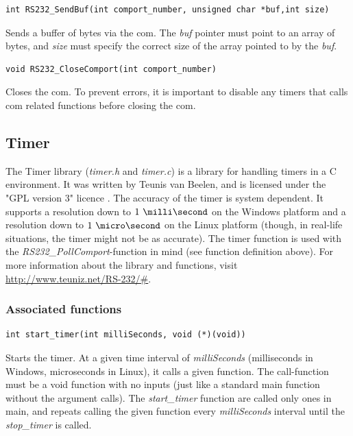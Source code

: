 \documentclass[main.tex]{subfiles}
\begin{document}
\begin{lstlisting}[frame=single] 
int RS232_SendBuf(int comport_number, unsigned char *buf,int size)
\end{lstlisting}
Sends a buffer of bytes via the \gls{com}. The \textit{buf} pointer must point to an array of bytes, and \textit{size} must specify the correct size of the array pointed to by the \textit{buf}.\\

\begin{lstlisting}[frame=single] 
void RS232_CloseComport(int comport_number)
\end{lstlisting}
Closes the \gls{com}. To prevent errors, it is important to disable any timers that calls \gls{com} related functions before closing the \gls{com}.\\

\subsection{Timer}

The Timer library (\textit{timer.h} and \textit{timer.c}) is a library for handling timers in a C environment. It was written by Teunis van Beelen, and is licensed under the "GPL version 3" licence \cite{gpl3}. The accuracy of the timer is system dependent. It supports a resolution down to $1~\milli\second$ on the Windows platform and a resolution down to $1~\micro\second$ on the Linux platform (though, in real-life situations, the timer might not be as accurate). The timer function is used with the \textit{RS232\_PollComport}-function in mind (see function definition above). For more information about the library and functions, visit \url{http://www.teuniz.net/RS-232/#}.

\subsubsection{Associated functions}


\begin{lstlisting}[frame=single] 
int start_timer(int milliSeconds, void (*)(void))
\end{lstlisting}
Starts the timer. At a given time interval of \textit{milliSeconds} (milliseconds in Windows, microseconds in Linux), it calls a given function. The call-function must be a void function with no inputs (just like a standard main function without the argument calls). The \textit{start\_timer} function are called only ones in main, and repeats calling the given function every \textit{milliSeconds} interval until the \textit{stop\_timer} is called.\\
\end{document}
